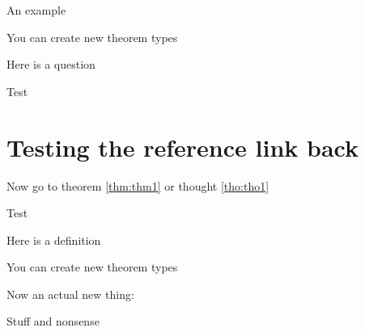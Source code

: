 \documentclass[12pt,english,a4paper]{extarticle}
\theoremstyle{plain}
\theoremstyle{definition}
\theoremstyle{plain}
\theoremstyle{plain}
\theoremstyle{plain}
\theoremstyle{definition}
\theoremstyle{definition}
\theoremstyle{definition}
\theoremstyle{remark}
\theoremstyle{plain}
\let\BeginKnitrBlock\begin \let\EndKnitrBlock\end
\renewcommand{\;}{\,}
\begin{document}
\BeginKnitrBlock{Example}
\protect\hypertarget{Example:unnamed-chunk-5}{}{\iffalse{} (\#\url{Example:unnamed-chunk-5}) \fi{}}An example
\EndKnitrBlock{Example}

\BeginKnitrBlock{Solution}
\protect\hypertarget{Solution:sol1}{}{\label{sol:sol1}}You can create new theorem types
\EndKnitrBlock{Solution}

\BeginKnitrBlock{Exercises}
\protect\hypertarget{Exercises:unnamed-chunk-6}{}{\iffalse{} (\#Exercises:unnamed-chunk-6) \fi{}}Here is a question
\EndKnitrBlock{Exercises}

\BeginKnitrBlock{solution}
\iffalse{} {Solution. } \fi{}

Test
\EndKnitrBlock{solution}

\hypertarget{testing-the-reference-link-back}{%
\section{Testing the reference link back}\label{testing-the-reference-link-back}}

Now go to theorem \ref{thm:thm1} or thought \ref{tho:tho1}

\BeginKnitrBlock{solution}
\iffalse{} {Solution. } \fi{}

Test
\EndKnitrBlock{solution}
\begingroup\renewcommand{\thedefinition}{\ref{def:truth}}
\BeginKnitrBlock{definition}
 Here is a definition
\EndKnitrBlock{definition}
\endgroup\addtocounter{definition}{-1}\begingroup\renewcommand{\theThought}{\ref{tho:tho1}}
\BeginKnitrBlock{Thought}[Bar of \ref{thm:thm1}]
\protect\hypertarget{Thought:tho1}{}{}You can create new theorem types
\EndKnitrBlock{Thought}
\endgroup\addtocounter{Thought}{-1}
Now an actual new thing:
\BeginKnitrBlock{Thought}
\protect\hypertarget{Thought:tho2}{}{\label{tho:tho2}}Stuff and nonsense
\EndKnitrBlock{Thought}
\end{document}
